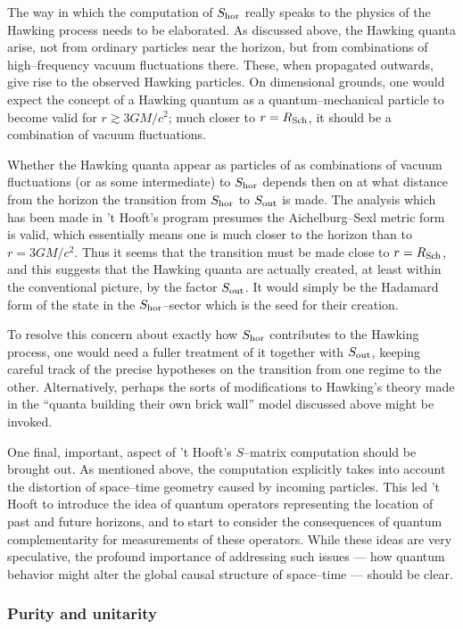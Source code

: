 The way in which the computation of $S_{\rm hor}$ really speaks to the physics
of the Hawking process needs to  be elaborated.   As discussed above, the
Hawking quanta arise, not from ordinary particles near the horizon, but from
combinations of high--frequency vacuum fluctuations there.   These, when
propagated outwards,  give rise to the observed Hawking particles.  On
dimensional grounds, one would expect the concept of a Hawking quantum as a
quantum--mechanical particle to become valid for $r\gtrsim 3GM/c^2$; much
closer to $r=R_{\rm Sch}$, it should  be a combination of vacuum
fluctuations.  

Whether the Hawking quanta appear as particles of as  combinations of
vacuum fluctuations (or as some intermediate) to $S_{\rm hor}$ depends
then
on at what distance from the horizon the transition from $S_{\rm hor}$
to $S_{\rm out}$ is made.  The analysis which has been made in 't
Hooft's program
presumes the Aichelburg--Sexl metric form is valid, which essentially
means one is much closer to the horizon than to $r=3GM/c^2$.  Thus it
seems that the transition must be made close to $r=R_{\rm Sch}$, and
this suggests that the Hawking quanta are actually created, at least
within the conventional picture, by the factor $S_{\rm out}$.  It would
simply be the Hadamard form of the state in the $S_{\rm hor}$--sector
which is the seed for their creation.  

To resolve this concern about exactly how
$S_{\rm hor}$ contributes to the
Hawking process, one would need a fuller treatment of it together with
$S_{\rm out}$, keeping careful track of the precise hypotheses on the
transition from one regime to the other.
Alternatively, perhaps the sorts of modifications to
Hawking's theory made in the ``quanta building their own brick wall''
model discussed above might be invoked.

One final, important, aspect of 't Hooft's $S$--matrix computation
should be brought out.  As mentioned above, the computation explicitly
takes into account the distortion of space--time geometry caused by
incoming particles.  This led 't Hooft to introduce the idea of
quantum operators representing the location of past and future
horizons, and to start to consider the consequences of quantum
complementarity for measurements of these operators.  While these ideas
are very speculative, the profound
importance of addressing such issues --- how
quantum behavior might alter the global causal structure of
space--time --- should be clear.

\subsubsection{Purity and unitarity}

